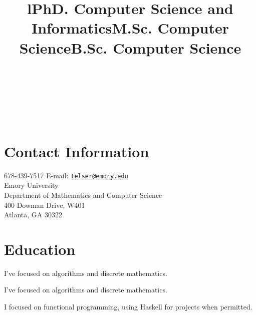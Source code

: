 \documentclass[margintitle,line]{res}
\begin{document}

\begin{resume}

\begin{format}
\\
\title{l}\\
\body\\
\end{format}



\section{Contact Information}

678-439-7517 \hfill {E-mail:} \href{mailto:telser@emory.edu}{\nolinkurl{telser@emory.edu}} \\
Emory University \\
Department of Mathematics and Computer Science \\
400 Dowman Drive, W401 \\
Atlanta, GA 30322


\section{Education}

\title{PhD. Computer Science and Informatics}
\begin{position}
I've focused on algorithms and discrete mathematics.
\end{position}

\title{M.Sc. Computer Science}
\begin{position}
I've focused on algorithms and discrete mathematics.
\end{position}

\title{B.Sc. Computer Science}
\begin{position}
  I focused on functional programming, using Haskell for projects when permitted.
\end{position}



\end{resume}
\end{document}
